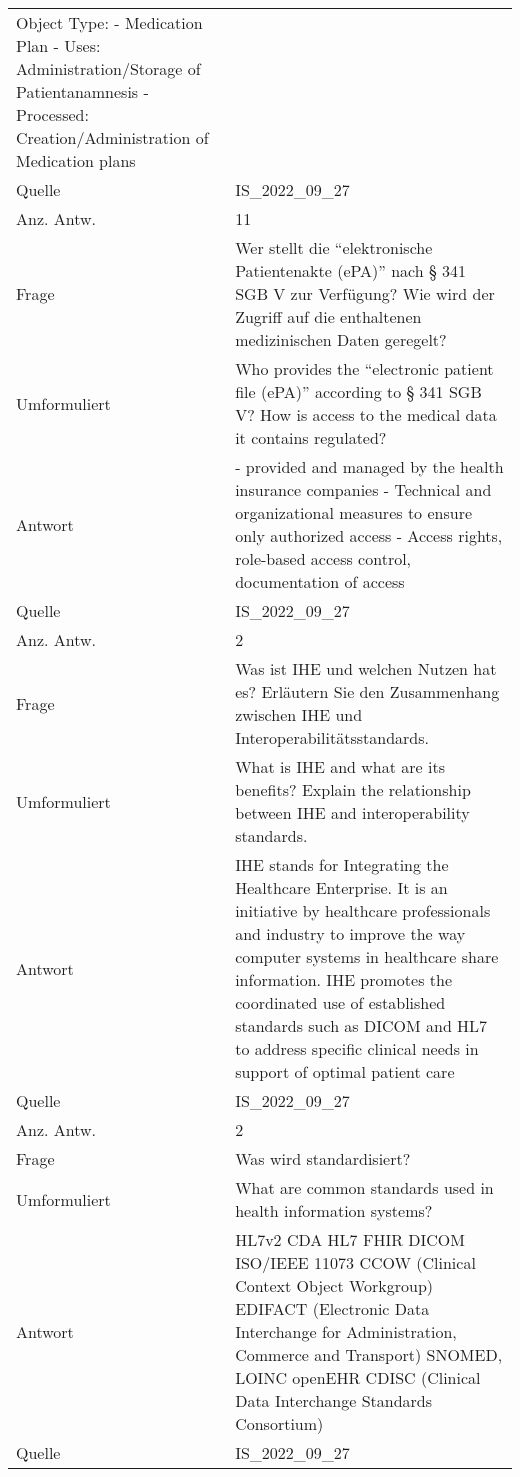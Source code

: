 \begin{landscape}
\begin{longtable}{p{3cm}p{}}
    Object Type:
    - Medication Plan
        - Uses: Administration/Storage of Patientanamnesis
        - Processed: Creation/Administration of Medication plans \\
    Quelle & IS\_2022\_09\_27 \\
    Anz. Antw. & 11 \\
    \midrule
    Frage & Wer stellt die ``elektronische Patientenakte (ePA)'' nach § 341 SGB V zur Verfügung? Wie wird der Zugriff auf die enthaltenen medizinischen Daten geregelt? \\
    Umformuliert & Who provides the ``electronic patient file (ePA)'' according to § 341 SGB V? How is access to the medical data it contains regulated? \\
    Antwort & - provided and managed by the health insurance companies
    - Technical and organizational measures to ensure only authorized access
    - Access rights, role-based access control, documentation of access \\
    Quelle & IS\_2022\_09\_27 \\
    Anz. Antw. & 2 \\
    \midrule
    Frage & Was ist IHE und welchen Nutzen hat es? Erläutern Sie den Zusammenhang zwischen IHE und Interoperabilitätsstandards.\\
    Umformuliert & What is IHE and what are its benefits? Explain the relationship between IHE and interoperability standards.\\
    Antwort & IHE stands for Integrating the Healthcare Enterprise.
    It is an initiative by healthcare professionals and industry to improve the way computer systems in healthcare share information.
    IHE promotes the coordinated use of established standards such as DICOM and HL7 to address specific clinical needs in support of optimal patient care \\
    Quelle & IS\_2022\_09\_27 \\
    Anz. Antw. & 2 \\
    \midrule
    Frage & Was wird standardisiert? \\
    Umformuliert & What are common standards used in health information systems? \\
    Antwort & HL7v2
    CDA
    HL7 FHIR
    DICOM
    ISO/IEEE 11073
    CCOW (Clinical Context Object Workgroup)
    EDIFACT (Electronic Data Interchange for Administration, Commerce and Transport)
    SNOMED, LOINC
    openEHR
    CDISC (Clinical Data Interchange Standards Consortium) \\
    Quelle & IS\_2022\_09\_27 \\

\end{longtable}
\end{landscape}
